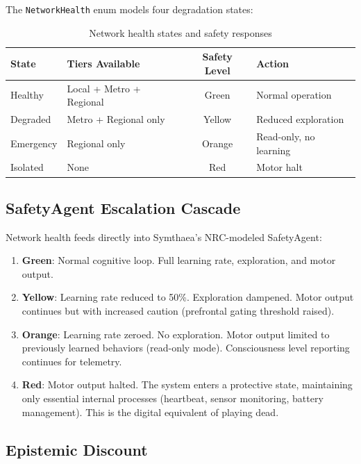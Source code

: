 \documentclass[11pt,twocolumn]{article}
\begin{document}
The \texttt{NetworkHealth} enum models four degradation states:

\begin{table}[H]
\centering
\caption{Network health states and safety responses}
\label{tab:health}
\scriptsize
\begin{tabular}{@{}llcl@{}}
\toprule
\textbf{State} & \textbf{Tiers Available} & \textbf{Safety Level} & \textbf{Action} \\
\midrule
Healthy & Local + Metro + Regional & Green & Normal operation \\
Degraded & Metro + Regional only & Yellow & Reduced exploration \\
Emergency & Regional only & Orange & Read-only, no learning \\
Isolated & None & Red & Motor halt \\
\bottomrule
\end{tabular}
\end{table}

\subsection{SafetyAgent Escalation Cascade}

Network health feeds directly into Symthaea's NRC-modeled SafetyAgent:

\begin{enumerate}[nosep]
  \item \textbf{Green}: Normal cognitive loop. Full learning rate,
    exploration, and motor output.
  \item \textbf{Yellow}: Learning rate reduced to 50\%. Exploration
    dampened. Motor output continues but with increased caution
    (prefrontal gating threshold raised).
  \item \textbf{Orange}: Learning rate zeroed. No exploration.
    Motor output limited to previously learned behaviors (read-only
    mode). Consciousness level reporting continues for telemetry.
  \item \textbf{Red}: Motor output halted. The system enters a
    protective state, maintaining only essential internal processes
    (heartbeat, sensor monitoring, battery management). This is the
    digital equivalent of playing dead.
\end{enumerate}

\subsection{Epistemic Discount}
\end{document}
